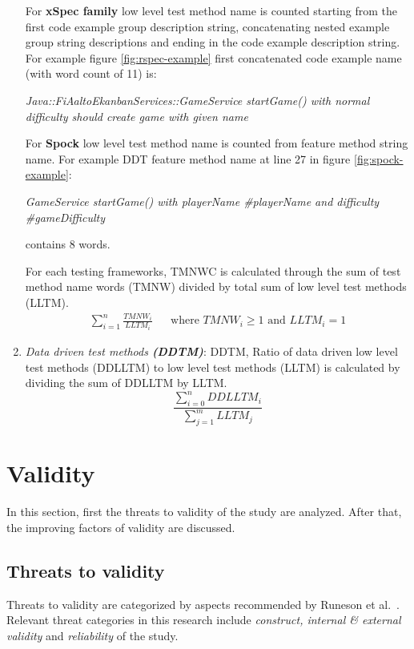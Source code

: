 \begin{addmargin}[0em]{0em}
\begin{enumerate}
    For \textbf{xSpec family} low level test method name is counted starting from the first code example group description string,
    concatenating nested example group string descriptions and ending in the code example description string.
    For example figure \ref{fig:rspec-example} first concatenated code example name (with word count of 11) is:

    \begin{center}
    \textit{Java::FiAaltoEkanbanServices::GameService startGame() with normal difficulty should create game with given name}
    \end{center}

    For \textbf{Spock} low level test method name is counted from feature method string name. For example DDT feature method name at
    line 27 in figure \ref{fig:spock-example}:
    \begin{center}
    \textit{GameService startGame() with playerName \#playerName and difficulty \#gameDifficulty}
    \end{center}
    contains 8 words.

    For each testing frameworks, TMNWC is calculated through the sum of test method name words (TMNW) divided by total sum of low level test methods (LLTM).
    \begin{align*}
        \sum_{i=1}^{n}\frac{TMNW_{i}}{LLTM_{i}} && \text {where } TMNW_{i} \geq 1 \text{ and } LLTM_{i} = 1
    \end{align*}

    \item \textit{Data driven test methods \textbf{(DDTM)}}:
    DDTM, Ratio of data driven low level test methods (DDLLTM) to low level test methods (LLTM) is calculated by dividing the sum
    of DDLLTM by LLTM.
    \[\frac{\sum_{i=0}^{n}DDLLTM_{i}}{\sum_{j=1}^{m}LLTM_{j}}\]
    \end{enumerate}
    \end{addmargin}

\section{Validity}
In this section, first the threats to validity of the study are analyzed. After that, the improving factors of validity
are discussed.

\subsection{Threats to validity}
Threats to validity are categorized by aspects recommended by Runeson et al.~\cite{runeson2012case}. Relevant threat categories in
this research include \textit{construct, internal \& external validity} and \textit{reliability} of the study.
